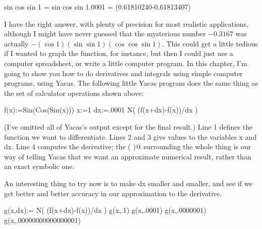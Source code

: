 \restartLineNumbers
\begin{eg}
\startcodeeg
\begin{Code}
  \ii sin cos sin 1 =  
  \ii sin cos sin 1.0001 =
  \ii(0.61810240-0.61813407) 
\end{Code}
\finishcodeeg
\end{eg}

I have the right answer, with plenty of precision for most realistic applications,
although I might have never guessed that the mysterious number $-0.3167$ was
actually $-(\cos 1)(\sin\sin 1)(\cos\cos\sin 1)$. This could get a little tedious if I wanted to graph the function,
for instance, but then I could just use a computer spreadsheet, or write a little
computer program. In this chapter, I'm going to show you how to do derivatives
and integrals using simple computer programs, using Yacas.
The following little Yacas program does the same thing as the set of calculator
operations shown above:

\restartLineNumbers
\begin{eg}
\startcodeeg
\begin{Code}
  \nn f(x):=Sin(Cos(Sin(x)))
  \nn x:=1
  \nn dx:=.0001
  \nn N( (f(x+dx)-f(x))/dx )
\end{Code}
\finishcodeeg
\end{eg}

(I've omitted all of Yacas's output except for the final result.)
Line 1 defines the function we want to differentiate. Lines 2 and
3 give values to the variables x and dx. Line 4 computes the derivative;
the \verb@N( )@ surrounding the whole thing is our way of telling Yacas
that we want an approximate numerical result, rather than an exact symbolic one.

An interesting thing to try now is to make dx smaller and smaller, and see if
we get better and better accuracy in our approximation to the derivative.

\begin{eg}\label{eg:derivative-limit}
\startcodeeg
\begin{Code}
  \nn g(x,dx):= 
  \cc N( (f(x+dx)-f(x))/dx )
  \nn g(x,.1)
  \nn g(x,.0001)
  \nn g(x,.0000001)
  \nn g(x,.00000000000000001)
\end{Code}
\end{eg}

